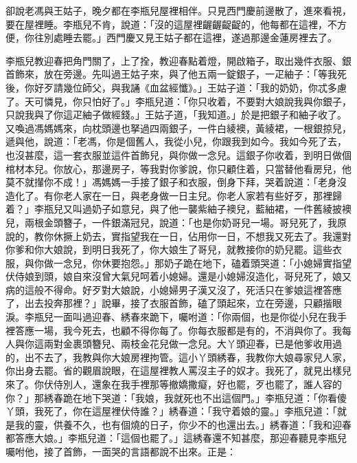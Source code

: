 卻說老馮與王姑子，晚夕都在李瓶兒屋裡相伴。只見西門慶前邊散了，進來看視，要在屋裡睡。李瓶兒不肯，說道：「沒的這屋裡齷齷齪齪的，他每都在這裡，不方便，你往別處睡去罷。」西門慶又見王姑子都在這裡，遂過那邊金蓮房裡去了。

李瓶兒教迎春把角門關了，上了拴，教迎春點着燈，開啟箱子，取出幾件衣服、銀首飾來，放在旁邊。先叫過王姑子來，與了他五兩一錠銀子，一疋紬子：「等我死後，你好歹請幾位師父，與我誦《血盆經懺》。」王姑子道：「我的奶奶，你忒多慮了。天可憐見，你只怕好了。」李瓶兒道：「你只收着，不要對大娘說我與你銀子，只說我與了你這疋紬子做經錢。」王姑子道，「我知道。」於是把銀子和紬子收了。又喚過馮媽媽來，向枕頭邊也拏過四兩銀子，一件白綾襖，黃綾裙，一根銀掠兒，遞與他，說道：「老馮，你是個舊人，我從小兒，你跟我到如今。我如今死了去，也沒甚麼，這一套衣服並這件首飾兒，與你做一念兒。這銀子你收着，到明日做個棺材本兒。你放心，那邊房子，等我對你爹說，你只顧住着，只當替他看房兒，他莫不就攆你不成！」{}{}馮媽媽一手接了銀子和衣服，倒身下拜，哭着說道：「老身沒造化了。有你老人家在一日，與老身做一日主兒。你老人家若有些好歹，那裡歸着？」{}李瓶兒又叫過奶子如意兒，與了他一襲紫紬子襖兒，藍紬裙，一件舊綾披襖兒，兩根金頭簪子，一件銀滿冠兒，說道：「也是你奶哥兒一場。哥兒死了，我原說的，教你休撅上奶去，實指望我在一日，佔用你一日，不想我又死去了。我還對你爹和你大娘說，到明日我死了，你大娘生了哥兒，就教接你的奶兒罷。這些衣服，與你做一念兒，你休要抱怨。」那奶子跪在地下，磕着頭哭道：「小媳婦實指望伏侍娘到頭，娘自來沒曾大氣兒呵着小媳婦。還是小媳婦沒造化，哥兒死了，娘又病的這般不得命。好歹對大娘說，小媳婦男子漢又沒了，死活只在爹娘這裡答應了，出去投奔那裡？」說畢，接了衣服首飾，磕了頭起來，立在旁邊，只顧揩眼淚。{}李瓶兒一面叫過迎春、綉春來跪下，囑咐道：「你兩個，也是你從小兒在我手裡答應一場，我今死去，也顧不得你每了。你每衣服都是有的，不消與你了。我每人與你這兩對金裹頭簪兒、兩枝金花兒做一念兒。大丫頭迎春，已是他爹收用過的，出不去了，我教與你大娘房裡拘管。這小丫頭綉春，我教你大娘尋家兒人家，你出身去罷。省的觀眉說眼，在這屋裡教人罵沒主子的奴才。我死了，就見出樣兒來了。你伏侍別人，還象在我手裡那等撤嬌撒癡，好也罷，歹也罷了，誰人容的你？」那綉春跪在地下哭道：「我娘，我就死也不出這個門。」李瓶兒道：「你看傻丫頭，我死了，你在這屋裡伏侍誰？」綉春道：「我守着娘的靈。」李瓶兒道：「就是我的靈，供養不久，也有個燒的日子，你少不的也還出去。」綉春道：「我和迎春都答應大娘。」李瓶兒道：「這個也罷了。」這綉春還不知甚麼，那迎春聽見李瓶兒囑咐他，接了首飾，一面哭的言語都說不出來。{}正是：

